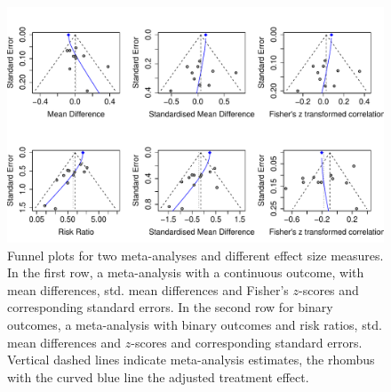 \documentclass[11pt,a4paper,twoside]{book}\usepackage[]{graphicx}\usepackage[]{color}
\newenvironment{knitrout}{}{} %
\begin{document}
\begin{figure}
\begin{knitrout}
\color{fgcolor}

{\centering \includegraphics[width=\textwidth-3cm]{figure/ch03_figunnamed-chunk-20-1} 

}



\end{knitrout}
\caption{Funnel plots for two meta-analyses and different effect size measures. In the first row, a meta-analysis with a continuous outcome, with mean differences, std. mean differences and Fisher's $z$-scores and corresponding standard errors. In the second row for binary outcomes, a meta-analysis with binary outcomes and risk ratios, std. mean differences and $z$-scores and corresponding standard errors.  Vertical dashed lines indicate meta-analysis estimates, the rhombus with the curved blue line the adjusted treatment effect.}
\label{fig:funnel.plot.change}
\end{figure}
\end{document}
